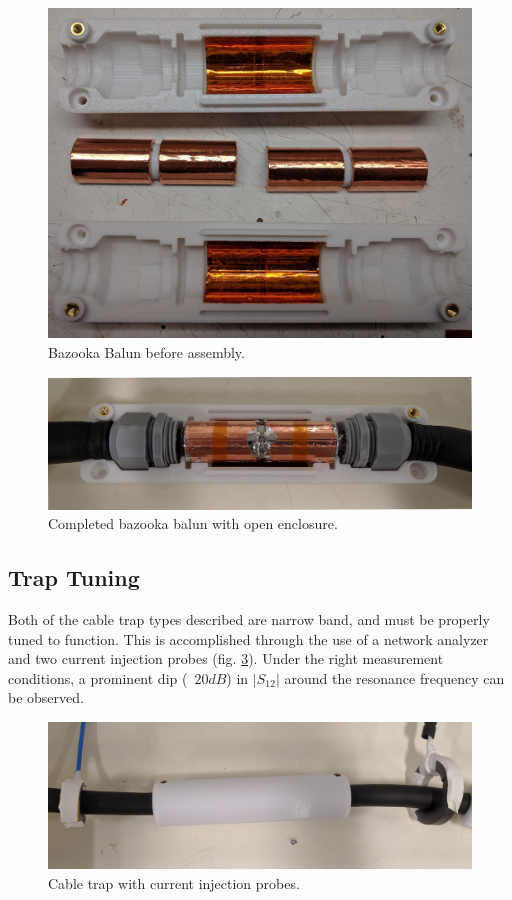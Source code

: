 \begin{figure}
\includegraphics[width=6in]{figures/bazooka_parts.jpg}
\caption{Bazooka Balun before assembly.}
\label{fig:bazooka_parts}
\end{figure}

\begin{figure}
\includegraphics[width=6in]{figures/bazooka_assembled.jpg}
\caption{Completed bazooka balun with open enclosure.}
\label{fig:bazooka_assembled}
\end{figure}

\subsection{Trap Tuning}
Both of the cable trap types described are narrow band, and must be properly tuned to function. This is accomplished
through the use of a network analyzer and two current injection probes (fig. \ref{fig:bazooka_under_test}). Under the
right measurement conditions, a prominent dip (~$20dB$) in $|S_{12}|$ around the resonance frequency can be observed.

\begin{figure}
\includegraphics[width=6in]{figures/bazooka_under_test.jpg}
\caption{Cable trap with current injection probes.}
\label{fig:bazooka_under_test}
\end{figure}
